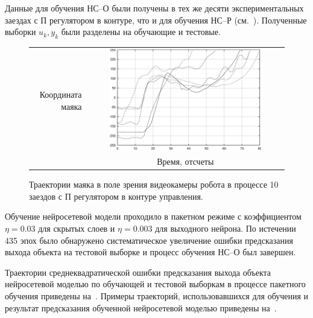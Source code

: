 Данные для обучения НС--О были получены в тех же десяти
экспериментальных заездах с П регулятором в контуре, что и для
обучения НС--Р (см.~).  Полученные
выборки ${u_k,y_k}$ были разделены на обучающие и тестовые.

\begin{figure}
\centering
  \begin{tabular}{rc}
    \begin{sideways}
      {\hspace{3cm}\small Координата маяка}
    \end{sideways}
    &
    \includegraphics[width=0.8\textwidth,%
                     totalheight=0.35\textheight]{moby_pc_x0-9_explore}\\
    & {\small Время, отсчеты} \\
\end{tabular}
\caption{Траектории маяка в поле зрения видеокамеры робота в процессе 10
заездов с П регулятором в контуре управления.}
\label{fig:moby_pc_x0-9_explore}
\end{figure}

Обучение нейросетевой модели проходило в пакетном режиме с
коэффициентом $\eta=0.03$ для скрытых слоев и $\eta=0.003$ для
выходного нейрона.  По истечении 435 эпох было обнаружено
систематическое увеличение ошибки предсказания выхода объекта на
тестовой выборке и процесс обучения НС--О был завершен.

Траектории среднеквадратической ошибки предсказания выхода объекта
нейросетевой моделью по обучающей и тестовой выборкам в процессе
пакетного обучения приведены на~.
Примеры траекторий, использовавшихся для обучения и результат
предсказания обученной нейросетевой моделью приведены
на~.

